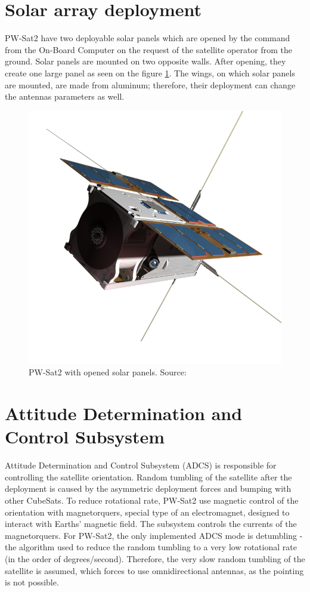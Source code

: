 \section{Solar array deployment}
PW-Sat2 have two deployable solar panels which are opened by the command from the On-Board Computer on the request of the satellite operator from the ground. Solar panels are mounted on two opposite walls. After opening, they create one large panel as seen on the figure \ref{PW-Sat_solar_panels}. The wings, on which solar panels are mounted, are made from aluminum; therefore, their deployment can change the antennas parameters as well.
\begin{figure}[h]
    \centering
    \includegraphics[width=0.45\paperwidth]{img/3/pwsat_solar_panels.png}
    \caption{PW-Sat2 with opened solar panels. Source: \cite{PW_sat2_photo}}
    \label{PW-Sat_solar_panels}
\end{figure}

\section{Attitude Determination and Control Subsystem}
Attitude Determination and Control Subsystem (ADCS) is responsible for controlling the satellite orientation. Random tumbling of the satellite after the deployment is caused by the asymmetric deployment forces and bumping with other CubeSats. To reduce rotational rate, PW-Sat2 use magnetic control of the orientation with magnetorquers, special type of an electromagnet, designed to interact with Earths' magnetic field. The subsystem controls the currents of the magnetorquers. For PW-Sat2, the only implemented ADCS mode is detumbling - the algorithm used to reduce the random tumbling to a very low rotational rate (in the order of degrees/second). Therefore, the very slow random tumbling of the satellite is assumed, which forces to use omnidirectional antennas, as the pointing is not possible.

